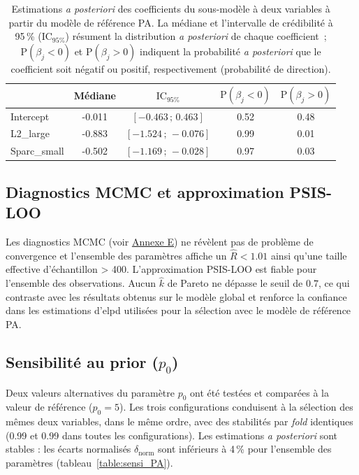 \begin{table}[ht]
	\centering
	\begin{tabular}{lcccc}
		\hline
		& Médiane & $\text{IC}_{95\%}$ & $\text{P}(\beta_j < 0)$ & $\text{P}(\beta_j > 0)$ \\
		\hline
		Intercept      &  -0.011 & $[-0.463 \,;\, 0.463]$ & 0.52 & 0.48 \\
		L2\_large      & -0.883 & $[-1.524 \,;\, -0.076]$ & 0.99 & 0.01 \\
		Sparc\_small   & -0.502 & $[-1.169 \,;\, -0.028]$ & 0.97 & 0.03 \\
		\hline
	\end{tabular}
	\caption[Estimations \textit{a posteriori} du sous-modèle réduit à partir du modèle de référence PA]{Estimations \textit{a posteriori} des coefficients du sous-modèle à deux variables à partir du modèle de référence PA. La médiane et l'intervalle de crédibilité à 95\,\% (IC$_{95\%}$) résument la distribution \textit{a posteriori} de chaque coefficient~; $\text{P}(\beta_j < 0)$ et $\text{P}(\beta_j > 0)$ indiquent la probabilité \textit{a posteriori} que le coefficient soit négatif ou positif, respectivement (probabilité de direction).}
	\label{table:inf_PA}
\end{table}

\subsection{Diagnostics MCMC et approximation PSIS-LOO}

Les diagnostics MCMC (voir \hyperref[fig:diag_mcmc_ex_PA]{Annexe E}) ne révèlent pas de problème de convergence et l'ensemble des paramètres affiche un $\hat{R} < 1.01$ ainsi qu'une taille effective d'échantillon > 400. L'approximation PSIS-LOO est fiable pour l'ensemble des observations. Aucun $\hat{k}$ de Pareto ne dépasse le seuil de $0.7$, ce qui contraste avec les résultats obtenus sur le modèle global et renforce la confiance dans les estimations d'elpd utilisées pour la sélection avec le modèle de référence PA. 


\subsection{Sensibilité au prior ($p_0$)}
Deux valeurs alternatives du paramètre $p_0$ ont été testées et comparées à la valeur de référence ($p_0 = 5$). Les trois configurations conduisent à la sélection des mêmes deux variables, dans le même ordre, avec des stabilités par \textit{fold} identiques (0.99 et 0.99 dans toutes les configurations). Les estimations \textit{a posteriori} sont stables : les écarts normalisés $\delta_{\text{norm}}$ sont inférieurs à 4\,\% pour l'ensemble des paramètres (tableau~\ref{table:sensi_PA}).

